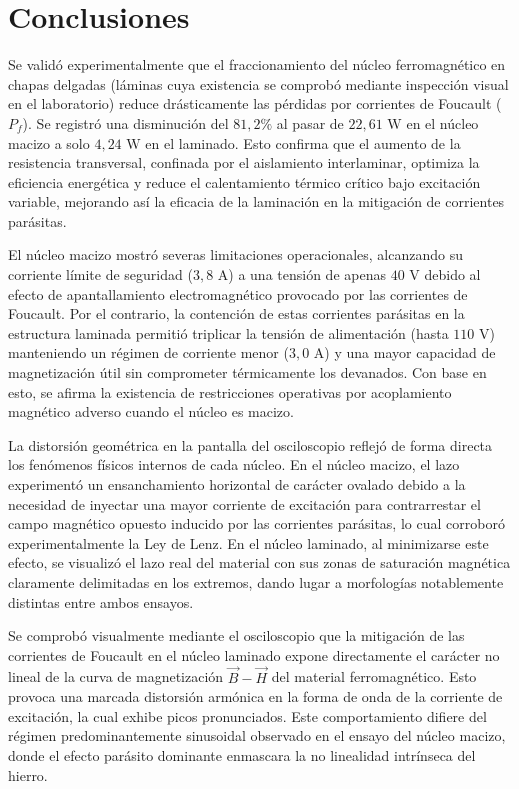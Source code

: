 \pagebreak
\section{Conclusiones}

Se validó experimentalmente que el fraccionamiento del núcleo ferromagnético en chapas delgadas (láminas cuya existencia se comprobó mediante inspección visual en el laboratorio) reduce drásticamente las pérdidas por corrientes de Foucault ($P_f$). Se registró una disminución del $81,2\%$ al pasar de $22,61\text{ W}$ en el núcleo macizo a solo $4,24\text{ W}$ en el laminado. Esto confirma que el aumento de la resistencia transversal, confinada por el aislamiento interlaminar, optimiza la eficiencia energética y reduce el calentamiento térmico crítico bajo excitación variable, mejorando así la eficacia de la laminación en la mitigación de corrientes parásitas.
    
El núcleo macizo mostró severas limitaciones operacionales, alcanzando su corriente límite de seguridad ($3,8\text{ A}$) a una tensión de apenas $40\text{ V}$ debido al efecto de apantallamiento electromagnético provocado por las corrientes de Foucault. Por el contrario, la contención de estas corrientes parásitas en la estructura laminada permitió triplicar la tensión de alimentación (hasta $110\text{ V}$) manteniendo un régimen de corriente menor ($3,0\text{ A}$) y una mayor capacidad de magnetización útil sin comprometer térmicamente los devanados. Con base en esto, se afirma la existencia de restricciones operativas por acoplamiento magnético adverso cuando el núcleo es macizo.
    
La distorsión geométrica en la pantalla del osciloscopio reflejó de forma directa los fenómenos físicos internos de cada núcleo. En el núcleo macizo, el lazo experimentó un ensanchamiento horizontal de carácter ovalado debido a la necesidad de inyectar una mayor corriente de excitación para contrarrestar el campo magnético opuesto inducido por las corrientes parásitas, lo cual corroboró experimentalmente la Ley de Lenz. En el núcleo laminado, al minimizarse este efecto, se visualizó el lazo real del material con sus zonas de saturación magnética claramente delimitadas en los extremos, dando lugar a morfologías notablemente distintas entre ambos ensayos.
    
Se comprobó visualmente mediante el osciloscopio que la mitigación de las corrientes de Foucault en el núcleo laminado expone directamente el carácter no lineal de la curva de magnetización $\vec{B}-\vec{H}$ del material ferromagnético. Esto provoca una marcada distorsión armónica en la forma de onda de la corriente de excitación, la cual exhibe picos pronunciados. Este comportamiento difiere del régimen predominantemente sinusoidal observado en el ensayo del núcleo macizo, donde el efecto parásito dominante enmascara la no linealidad intrínseca del hierro.
    
